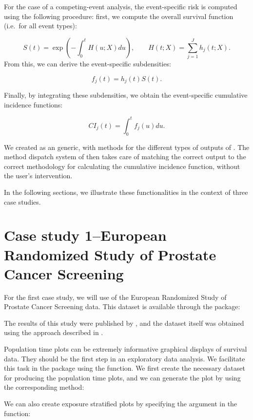 \documentclass[
]{jss}
\begin{document}
For the case of a competing-event analysis, the event-specific risk is
computed using the following procedure: first, we compute the overall
survival function (i.e.~for all event types):

\[ S(t) = \exp\left(-\int_0^t H(u;X) du\right),\qquad H(t;X) = \sum_{j=1}^J h_j(t;X).\]
From this, we can derive the event-specific subdensities:

\[ f_j(t) = h_j(t)S(t).\]

Finally, by integrating these subdensities, we obtain the event-specific
cumulative incidence functions:

\[ CI_j(t) = \int_0^t f_j(u)du.\]

We created  as an  generic, with methods for
the different types of outputs of . The method
dispatch system of  then takes care of matching the correct
output to the correct methodology for calculating the cumulative
incidence function, without the user's intervention.

In the following sections, we illustrate these functionalities in the
context of three case studies.

\hypertarget{case-study-1european-randomized-study-of-prostate-cancer-screening}{%
\section{Case study 1--European Randomized Study of Prostate Cancer
Screening}\label{case-study-1european-randomized-study-of-prostate-cancer-screening}}

For the first case study, we will use of the European Randomized Study
of Prostate Cancer Screening data. This dataset is available through the
 package:

The results of this study were published by
\citep{schroder2009screening}, and the dataset itself was obtained using
the approach described in \citep{liu2014recovering}.

Population time plots can be extremely informative graphical displays of
survival data. They should be the first step in an exploratory data
analysis. We facilitate this task in the  package using
the  function. We first create the necessary dataset for
producing the population time plots, and we can generate the plot by
using the corresponding  method:

We can also create exposure stratified plots by specifying the
 argument in the  function:
\end{document}
